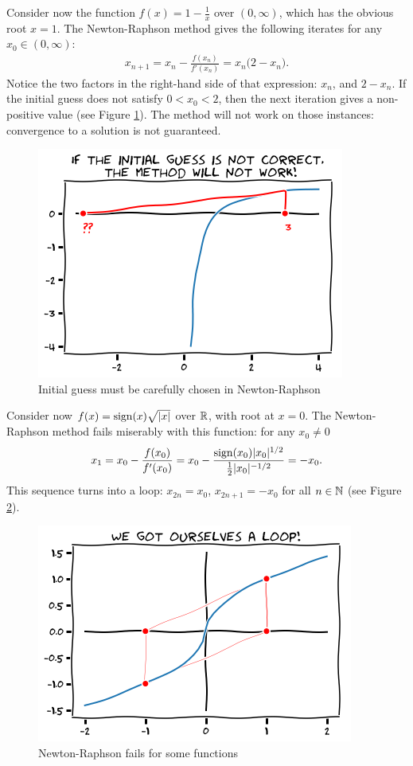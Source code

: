 \begin{example}\label{example:NewtonRaphsonChoice}
Consider now the function $f(x) = 1-\tfrac{1}{x}$ over $(0, \infty)$, which has the obvious root $x=1$. The Newton-Raphson method gives the following iterates for any $x_0 \in (0,\infty)$:
\begin{align*}
x_{n+1} = x_n - \frac{f(x_n)}{f'(x_n)} = x_n \big( 2- x_n \big).
\end{align*}
Notice the two factors in the right-hand side of that expression: $x_n$, and $2-x_n$.  If the initial guess does not satisfy $0<x_0<2$, then the next iteration gives a non-positive value (see Figure \ref{figure:NewtonRaphsonChoice}).  The method will not work on those instances: convergence to a solution is not guaranteed.
\begin{figure}[ht!]
\includegraphics[width=0.55\linewidth]{images/badNewton.png}
\caption{Initial guess must be carefully chosen in Newton-Raphson}
\label{figure:NewtonRaphsonChoice}
\end{figure}
\end{example}

\begin{example}\label{example:NewtonRaphsonloop}
Consider now $f(x) = \operatorname{sign}(x)\sqrt{\lvert x \rvert}$ over $\mathbb{R}$, with root at $x=0$.  The Newton-Raphson method fails miserably with this function: for any $x_0 \neq 0$
\begin{align*}
x_1 = x_0 - \frac{f(x_0)}{f'(x_0)} = x_0 - \frac{\operatorname{sign}(x_0)\lvert x_0 \rvert^{1/2}}{\tfrac{1}{2}\lvert x_0 \rvert^{-1/2}} = -x_0.
\end{align*}
This sequence turns into a loop: $x_{2n}=x_0$, $x_{2n+1}=-x_0$ for all $n\in \mathbb{N}$ (see Figure \ref{figure:NewtonRaphsonloop}).
\begin{figure}[ht!]
\includegraphics[width=0.55\linewidth]{images/loop.png}
\caption{Newton-Raphson fails for some functions}
\label{figure:NewtonRaphsonloop}
\end{figure}
\end{example}


